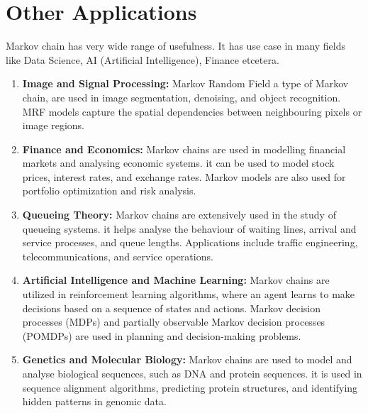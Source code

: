 \section{Other Applications}
Markov chain has very wide range of usefulness. It has use case in many fields like Data Science, AI (Artificial Intelligence), Finance etcetera.

\begin{enumerate}
    \item \textbf{Image and Signal Processing:}  Markov Random Field  a type of Markov chain, are used in image segmentation, denoising, and object recognition. 
        MRF models capture the spatial dependencies between neighbouring pixels or image regions.
    \item \textbf{Finance and Economics:} Markov chains are used in modelling financial markets and analysing economic systems. 
        it can be used to model stock prices, interest rates, and exchange rates. Markov models are also used for portfolio optimization and risk analysis.
    \item \textbf{Queueing Theory:} Markov chains are extensively used in the study of queueing systems. 
        it helps analyse the behaviour of waiting lines, arrival and service processes, and queue lengths. 
        Applications include traffic engineering, telecommunications, and service operations.
    \item \textbf{Artificial Intelligence and Machine Learning:} Markov chains are utilized in reinforcement learning algorithms, 
        where an agent learns to make decisions based on a sequence of states and actions. 
        Markov decision processes (MDPs) and partially observable Markov decision processes (POMDPs) are used in planning and decision-making problems.
    \item \textbf{Genetics and Molecular Biology:} Markov chains are used to model and analyse biological sequences, such as DNA and protein sequences. 
        it is used in sequence alignment algorithms, predicting protein structures, and identifying hidden patterns in genomic data. 
\end{enumerate}

